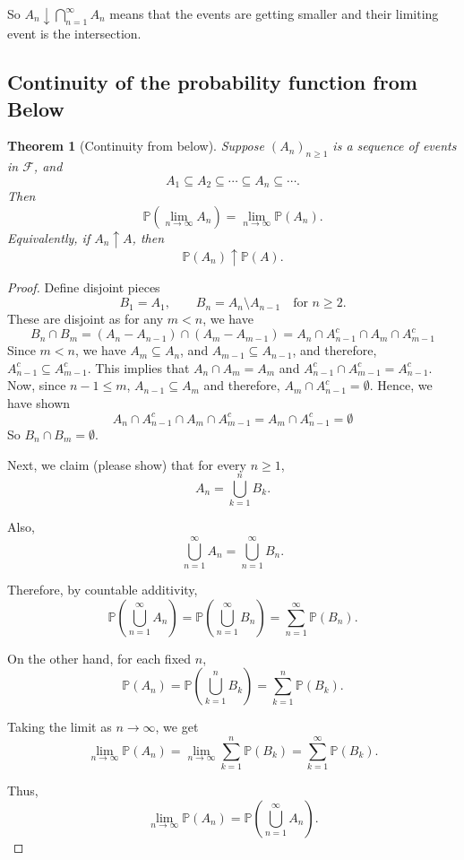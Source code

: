 \documentclass[11pt]{article}
\newcommand{\Prob}{\mathbb{P}}
\theoremstyle{definition}
\theoremstyle{plain}
\newtheorem{theorem}{Theorem}
\theoremstyle{remark}
\begin{document}
So $A_n\downarrow \bigcap_{n=1}^{\infty} A_n$ means that the events are getting smaller and their limiting event is the intersection.

\subsection*{Continuity of the probability function from Below}

\begin{theorem}[Continuity from below] \label{conbel}
Suppose $(A_n)_{n\geq 1}$ is a sequence of events in $\mathcal{F}$, and
\[
A_1\subseteq A_2\subseteq \cdots \subseteq A_n\subseteq \cdots.
\]
Then
\[
\Prob\left(\lim_{n\to \infty }A_n \right)
=
\lim_{n\to\infty} \Prob(A_n).
\]
Equivalently, if $A_n\uparrow A$, then
\[
\Prob(A_n)\uparrow \Prob(A).
\]
\end{theorem}

\begin{proof}
Define disjoint pieces
\[
B_1=A_1, \qquad B_n=A_n\setminus A_{n-1}\quad \text{for } n\ge 2.
\]
These are disjoint as for any $m<n$, we have
\begin{equation*}
    B_n\cap B_m=(A_n - A_{n-1})\cap (A_m - A_{m-1}) =A_n\cap A_{n-1}^c \cap A_m\cap A_{m-1}^c
\end{equation*}
Since $m<n$, we have $A_m \subseteq A_n$, and $A_{m-1}\subseteq A_{n-1}$, and therefore, $A_{n-1}^c\subseteq A_{m-1}^c$. This implies that $A_n\cap A_m=A_m$ and $A_{n-1}^c\cap A_{m-1}^c=A_{n-1}^c$. Now, since $n-1\leq m$, $A_{n-1}\subseteq A_m$ and therefore, $A_m\cap A_{n-1}^c=\emptyset$. Hence, we have shown
\begin{equation*}
    A_n\cap A_{n-1}^c \cap A_m\cap A_{m-1}^c=A_m \cap A_{n-1}^c=\emptyset
\end{equation*}
So $B_n\cap B_m=\emptyset$.






Next, we claim (please show) that for every $n\geq1$,
\[
A_n = \bigcup_{k=1}^n B_k.
\]

Also,
\[
\bigcup_{n=1}^{\infty} A_n
=
\bigcup_{n=1}^{\infty} B_n.
\]

Therefore, by countable additivity,
\[
\Prob\left(\bigcup_{n=1}^{\infty} A_n\right)
=
\Prob\left(\bigcup_{n=1}^{\infty} B_n\right)
=
\sum_{n=1}^{\infty}\Prob(B_n).
\]

On the other hand, for each fixed $n$,
\[
\Prob(A_n)
=
\Prob\left(\bigcup_{k=1}^n B_k\right)
=
\sum_{k=1}^n \Prob(B_k).
\]

Taking the limit as $n\to\infty$, we get
\[
\lim_{n\to\infty}\Prob(A_n)
=
\lim_{n\to\infty}\sum_{k=1}^n \Prob(B_k)
=
\sum_{k=1}^{\infty}\Prob(B_k).
\]

Thus,
\[
\lim_{n\to\infty}\Prob(A_n)
=
\Prob\left(\bigcup_{n=1}^{\infty} A_n\right).
\]
\end{proof}
\end{document}
